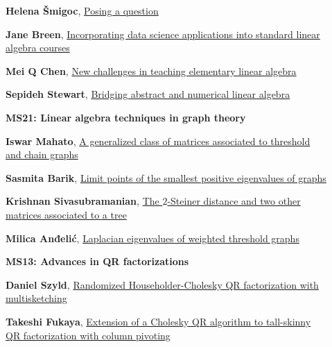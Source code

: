 \documentclass[ILAS2025-program.tex]{subfiles}
\begin{document}
\begin{description}
\begin{description}
    \item[] \hypertarget{up0331}{}\textbf{Helena Šmigoc}, \hyperlink{down0331}{Posing a question}
        \item[] \hypertarget{up0332}{}\textbf{Jane Breen}, \hyperlink{down0332}{Incorporating data science applications into standard linear algebra courses
}
        \item[] \hypertarget{up0333}{}\textbf{Mei Q Chen}, \hyperlink{down0333}{New challenges in teaching elementary linear algebra}
        \item[] \hypertarget{up0334}{}\textbf{Sepideh Stewart}, \hyperlink{down0334}{Bridging abstract and numerical linear algebra}
        \end{description}
    \begin{description}
    \item[] {\color{mstitle}\textbf{MS21: Linear algebra techniques in graph theory}} 
    \item[] \hypertarget{up0335}{}\textbf{Iswar Mahato}, \hyperlink{down0335}{A generalized class of matrices associated to threshold and chain graphs}
        \item[] \hypertarget{up0336}{}\textbf{Sasmita Barik}, \hyperlink{down0336}{Limit points of the smallest positive eigenvalues of graphs
}
        \item[] \hypertarget{up0337}{}\textbf{Krishnan Sivasubramanian}, \hyperlink{down0337}{The $2$-Steiner distance and two other matrices associated to a tree}
        \item[] \hypertarget{up0338}{}\textbf{Milica Anđelić}, \hyperlink{down0338}{Laplacian eigenvalues of weighted threshold graphs}
        \end{description}
    \begin{description}
    \item[] {\color{mstitle}\textbf{MS13: Advances in QR factorizations}} 
    \item[] \hypertarget{up0339}{}\textbf{Daniel Szyld}, \hyperlink{down0339}{Randomized Householder-Cholesky QR factorization with multisketching}
        \item[] \hypertarget{up0340}{}\textbf{Takeshi Fukaya}, \hyperlink{down0340}{Extension of a Cholesky QR algorithm to tall-skinny QR factorization with column pivoting
}
\end{description}
\end{description}
\end{document}
